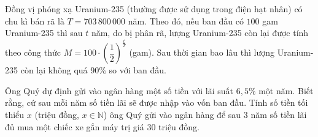 \begin{bt}%
	Đồng vị phóng xạ Uranium-235  (thường được sử dụng trong điện hạt nhân) có chu kì bán rã là $T=703\,800\,000$ năm. Theo đó, nếu ban đầu có $100$ gam Uranium-235 thì sau $t$ năm, do bị phân rã, lượng Uranium-235 còn lại được tính theo công thức $M=100\cdot\left(\dfrac{1}{2} \right)^{\tfrac{t}{T}}$ (gam). Sau thời gian bao lâu thì lượng Uranium-235 còn lại không quá $90\%$ so với ban đầu.
\end{bt}

\begin{bt}%
	Ông Quý dự định  gửi vào ngân hàng một số tiền với lãi suất $6{,}5\%$ một năm. Biết rằng, cứ sau mỗi năm số tiền lãi sẽ được nhập vào vốn ban đầu. Tính số tiền tối thiểu $x$ (triệu đồng, $x\in \mathbb{N}$) ông Quý gửi vào ngân hàng để sau $3$ năm số tiền lãi đủ mua một chiếc xe gắn máy trị giá 30 triệu đồng.
\end{bt}

